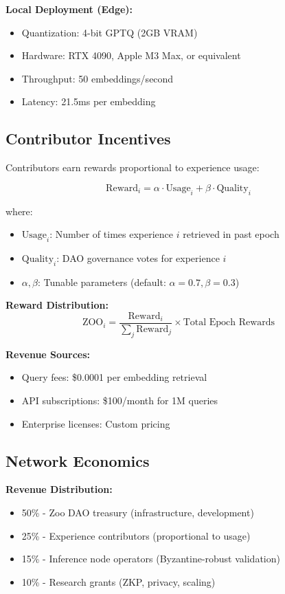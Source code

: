 \documentclass[11pt,a4paper]{article}
\begin{document}
\textbf{Local Deployment (Edge):}
\begin{itemize}
\item Quantization: 4-bit GPTQ (2GB VRAM)
\item Hardware: RTX 4090, Apple M3 Max, or equivalent
\item Throughput: 50 embeddings/second
\item Latency: 21.5ms per embedding
\end{itemize}

\subsection{Contributor Incentives}

Contributors earn rewards proportional to experience usage:

\begin{equation}
\text{Reward}_i = \alpha \cdot \text{Usage}_i + \beta \cdot \text{Quality}_i
\end{equation}

where:
\begin{itemize}
\item $\text{Usage}_i$: Number of times experience $i$ retrieved in past epoch
\item $\text{Quality}_i$: DAO governance votes for experience $i$
\item $\alpha, \beta$: Tunable parameters (default: $\alpha=0.7, \beta=0.3$)
\end{itemize}

\textbf{Reward Distribution:}
\begin{equation}
\text{ZOO}_i = \frac{\text{Reward}_i}{\sum_j \text{Reward}_j} \times \text{Total Epoch Rewards}
\end{equation}

\textbf{Revenue Sources:}
\begin{itemize}
\item Query fees: \$0.0001 per embedding retrieval
\item API subscriptions: \$100/month for 1M queries
\item Enterprise licenses: Custom pricing
\end{itemize}

\subsection{Network Economics}

\textbf{Revenue Distribution:}
\begin{itemize}
\item 50\% - Zoo DAO treasury (infrastructure, development)
\item 25\% - Experience contributors (proportional to usage)
\item 15\% - Inference node operators (Byzantine-robust validation)
\item 10\% - Research grants (ZKP, privacy, scaling)
\end{itemize}
\end{document}
